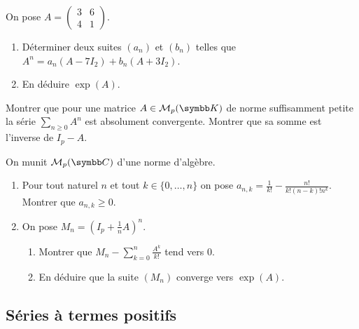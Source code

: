 \begin{exercice}
    On pose $A=\begin{pmatrix}3&6\\ 4&1\end{pmatrix}$.
    \begin{enumerate}
        \item Déterminer deux suites $(a_{n})$ et $(b_{n})$ telles que $A^{n}=a_{n}(A-7I_{2})+b_{n}(A+3I_{2})$.
        \item En déduire $\exp(A)$.
    \end{enumerate}
\end{exercice}

\begin{exercice}
    Montrer que pour une matrice $A\in \mathcal{M}_{p}(\K)$ de norme suffisamment petite la série $\sum_{n\geqslant0}A^{n}$ est absolument convergente. 
    Montrer que sa somme est l'inverse de $I_{p}-A$.
\end{exercice}

\begin{exercice}
    On munit $\mathcal{M}_{p}(\C)$ d'une norme d'algèbre.
    \begin{enumerate}
        \item Pour tout naturel $n$ et tout $k\in\{0,\dots,n\}$ on pose $a_{n,k}=\frac{1}{k!}-\frac{n!}{k!(n-k)!n^{k}}$. 
            Montrer que $a_{n,k}\geqslant0$.
        \item On pose $M_{n}=(I_{p}+\frac{1}{n}A)^{n}$.
        \begin{enumerate}
            \item Montrer que $\displaystyle M_{n}-\sum_{k=0}^{n}\frac{A^k}{k!}$ tend vers 0.
            \item En déduire que la suite $(M_{n})$ converge vers $\exp(A)$.
        \end{enumerate}
    \end{enumerate}
\end{exercice}

\subsection{Séries à termes positifs}

